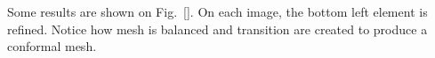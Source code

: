 \documentclass[10pt]{article}
\begin{document}
Some results are shown on Fig.~\ref{}. On each image, the bottom left element is refined. Notice how mesh is balanced and transition are created to produce a conformal mesh.
\begin{figure}[htb]
\centering
\end{figure}
\end{document}
